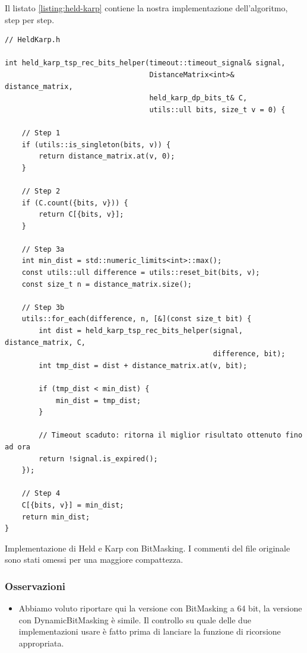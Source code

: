\noindent Il listato \ref{listing:held-karp} contiene la nostra implementazione dell'algoritmo, step per step.

\begin{listing}[!ht]
\begin{verbatim}
// HeldKarp.h

int held_karp_tsp_rec_bits_helper(timeout::timeout_signal& signal,
                                  DistanceMatrix<int>& distance_matrix,
                                  held_karp_dp_bits_t& C,
                                  utils::ull bits, size_t v = 0) {
    
    // Step 1
    if (utils::is_singleton(bits, v)) {
        return distance_matrix.at(v, 0);
    }

    // Step 2 
    if (C.count({bits, v})) {
        return C[{bits, v}];
    }
    
    // Step 3a
    int min_dist = std::numeric_limits<int>::max();
    const utils::ull difference = utils::reset_bit(bits, v);
    const size_t n = distance_matrix.size();

    // Step 3b
    utils::for_each(difference, n, [&](const size_t bit) {
        int dist = held_karp_tsp_rec_bits_helper(signal, distance_matrix, C,
                                                 difference, bit);
        int tmp_dist = dist + distance_matrix.at(v, bit);

        if (tmp_dist < min_dist) {
            min_dist = tmp_dist;
        }

        // Timeout scaduto: ritorna il miglior risultato ottenuto fino ad ora
        return !signal.is_expired();
    });
    
    // Step 4
    C[{bits, v}] = min_dist;
    return min_dist;
}

\end{verbatim}
\caption{Implementazione di Held e Karp con BitMasking. I commenti del file originale sono stati omessi per una maggiore compattezza.}
\label{listing:held-karp}
\end{listing}

\subsubsection{Osservazioni}

\begin{itemize}
    \item Abbiamo voluto riportare qui la versione con BitMasking a 64 bit, la versione con DynamicBitMasking è simile. Il controllo su quale delle due implementazioni usare è fatto prima di lanciare la funzione di ricorsione appropriata.\\
\end{itemize}

